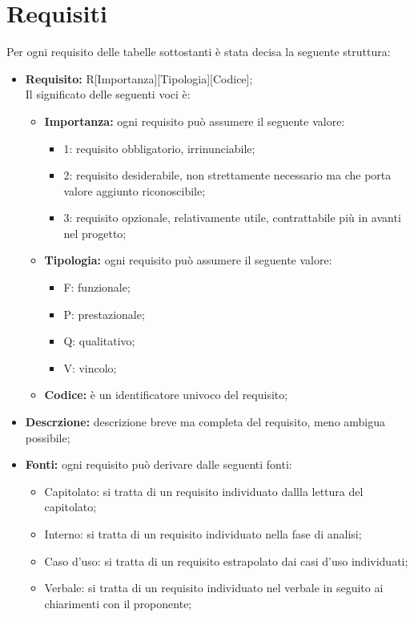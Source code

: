 \section{Requisiti}
Per ogni requisito delle tabelle sottostanti è stata decisa la seguente struttura: 
\begin{itemize}
\item\textbf{Requisito:} R[Importanza][Tipologia][Codice];\\
Il significato delle seguenti voci è:
	\begin{itemize}
	\item\textbf{Importanza:} ogni requisito può assumere il seguente valore:
		\begin{itemize}
		\item 1: requisito obbligatorio, irrinunciabile;
		\item 2: requisito desiderabile, non strettamente necessario ma che porta valore aggiunto riconoscibile;
		\item 3: requisito opzionale, relativamente utile, contrattabile più in avanti nel progetto;
		\end{itemize}
	\item\textbf{Tipologia:} ogni requisito può assumere il seguente valore:
		\begin{itemize}
		\item F: funzionale;
		\item P: prestazionale;
		\item Q: qualitativo;
		\item V: vincolo;
		\end{itemize}
	\item\textbf{Codice:} è un identificatore univoco del requisito;
	\end{itemize}
\item\textbf{Descrzione:} descrizione breve ma completa del requisito, meno ambigua possibile;
\item\textbf{Fonti:} ogni requisito può derivare dalle seguenti fonti:
	\begin{itemize}
		\item Capitolato: si tratta di un requisito individuato dallla lettura del capitolato;
		\item Interno: si tratta di un requisito individuato nella fase di analisi;
		\item Caso d'uso: si tratta di un requisito estrapolato dai casi d'uso individuati;
		\item Verbale: si tratta di un requisito individuato nel verbale in seguito ai chiarimenti con il proponente;
	\end{itemize}
\end{itemize}


